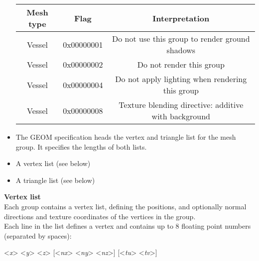 \documentclass[Orbiter Developer Manual.tex]{subfiles}
\begin{document}
\begin{itemize}
\begin{table}[H]
	\centering
	\begin{tabular}{ |c|c|c| }
	\hline\rule{0pt}{2ex}
	\textbf{Mesh type} & \textbf{Flag} & \textbf{Interpretation} \\
	\hline\rule{0pt}{2ex}
	Vessel & 0x00000001 & Do not use this group to render ground shadows\\
	\hline\rule{0pt}{2ex}
	Vessel & 0x00000002 & Do not render this group\\
	\hline\rule{0pt}{2ex}
	Vessel & 0x00000004 & Do not apply lighting when rendering this group\\
	\hline\rule{0pt}{2ex}
	Vessel & 0x00000008 & Texture blending directive: additive with background\\
	\hline
	\end{tabular}
\end{table}

\item The GEOM specification heads the vertex and triangle list for the mesh group. It specifies the lengths of both lists.
\item A vertex list (see below)
\item A triangle list (see below)
\end{itemize}

\noindent
\textbf{Vertex list}\\
Each group contains a vertex list, defining the positions, and optionally normal directions and texture coordinates of the vertices in the group.\\
Each line in the list defines a vertex and contains up to 8 floating point numbers (separated by spaces):

\indent <\textit{x}> <\textit{y}> <\textit{z}> [<\textit{nx}> <\textit{ny}> <\textit{nz}>] [<\textit{tu}> <\textit{tv}>]
\end{document}
